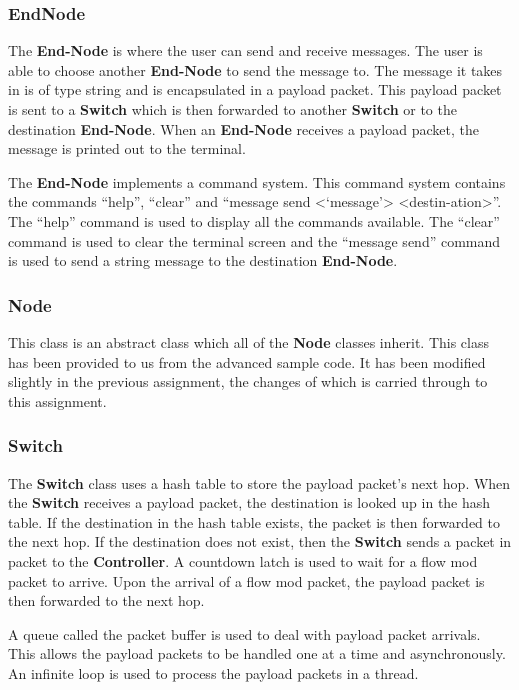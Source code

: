 \documentclass{article}
\begin{document}
\subsubsection{EndNode}
The \textbf{End-Node} is where the user can send and receive messages. The user
is able to choose another \textbf{End-Node} to send the message to. The message
it takes in is of type string and is encapsulated in a payload packet. This
payload packet is sent to a \textbf{Switch} which is then forwarded to another
\textbf{Switch} or to the destination \textbf{End-Node}. When an \textbf{End-Node}
receives a payload packet, the message is printed out to the terminal.

The \textbf{End-Node} implements a command system. This command system contains
the commands ``help'', ``clear'' and ``message send
\textless`message'\textgreater
\textless{}destin-\newline{}ation\textgreater{}''. The ``help'' command is used
to display all the commands available. The ``clear'' command is used to clear the
terminal screen and the ``message send'' command is used to send a string
message to the destination \textbf{End-Node}.

\subsubsection{Node}
This class is an abstract class which all of the \textbf{Node} classes inherit.
This class has been provided to us from the advanced sample code. It has been
modified slightly in the previous assignment, the changes of which is carried
through to this assignment.

\subsubsection{Switch}
The \textbf{Switch} class uses a hash table to store the payload packet's next
hop. When the \textbf{Switch} receives a payload packet, the destination is
looked up in the hash table. If the destination in the hash table exists, the
packet is then forwarded to the next hop. If the destination does not exist,
then the \textbf{Switch} sends a packet in packet to the \textbf{Controller}.
A countdown latch is used to wait for a flow mod packet to arrive. Upon the
arrival of a flow mod packet, the payload packet is then forwarded to the
next hop.

A queue called the packet buffer is used to deal with payload packet arrivals.
This allows the payload packets to be handled one at a time and asynchronously.
An infinite loop is used to process the payload packets in a thread.
\end{document}
